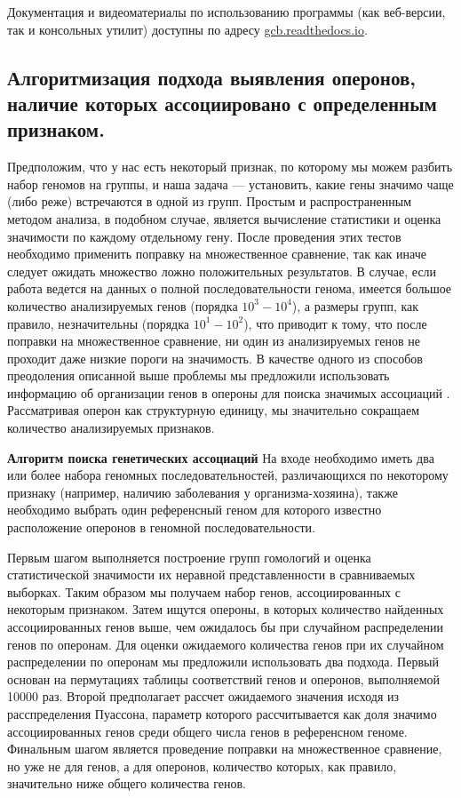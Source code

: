 Документация и видеоматериалы по использованию программы (как веб-версии, так и консольных утилит) доступны по адресу \url{gcb.readthedocs.io}. 

\subsection*{Алгоритмизация подхода выявления оперонов, наличие которых ассоциировано с определенным признаком. } \label{chaptOperons}

Предположим, что у нас есть некоторый признак, по которому мы можем разбить набор геномов на группы, и наша задача --- установить, какие гены значимо чаще (либо реже) встречаются в одной из групп. Простым и распространенным методом анализа, в подобном случае, является вычисление статистики и оценка значимости по каждому отдельному гену. После проведения этих тестов необходимо применить поправку на множественное сравнение, так как иначе следует ожидать множество ложно положительных результатов. В случае, если работа ведется на данных о полной последовательности генома, имеется большое количество анализируемых генов (порядка $10^3 - 10^4$), а размеры групп, как правило, незначительны (порядка $10^1 - 10^2$), что приводит к тому, что после поправки на множественное сравнение, ни один из анализируемых генов не проходит даже низкие пороги на значимость. В качестве одного из способов преодоления описанной выше проблемы мы предложили использовать информацию об организации генов в опероны для поиска значимых ассоциаций \cite{rakitina2017genome}. Рассматривая оперон как структурную единицу, мы значительно сокращаем количество анализируемых признаков.

\textbf{Алгоритм поиска генетических ассоциаций}
На входе необходимо иметь два или более набора геномных последовательностей, различающихся по некоторому признаку (например, наличию заболевания у организма-хозяина), также необходимо выбрать один референсный геном для которого известно расположение оперонов в геномной последовательности.

Первым шагом выполняется построение групп гомологий и оценка статистической значимости их неравной представленности в сравниваемых выборках. Таким образом мы получаем набор генов, ассоциированных с некоторым признаком. Затем ищутся опероны, в которых количество найденных ассоциированных генов выше, чем ожидалось бы при случайном распределении генов по оперонам. Для оценки ожидаемого количества генов при их случайном распределении по оперонам мы предложили использовать два подхода. Первый основан на пермутациях таблицы соответствий генов и оперонов, выполняемой 10000 раз. Второй предполагает рассчет ожидаемого значения исходя из расспределения Пуассона, параметр которого рассчитывается как доля значимо ассоциированных генов среди общего числа генов в референсном геноме. Финальным шагом является проведение поправки на множественное сравнение, но уже не для генов, а для оперонов, количество которых, как правило, значительно ниже общего количества генов. 

